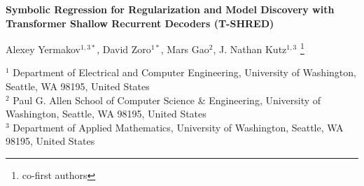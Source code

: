 \documentclass[11pt, a4paper]{article}
\begin{document}
\begin{center}
   { \LARGE \bf Symbolic Regression for Regularization and Model Discovery with Transformer Shallow Recurrent Decoders (T-SHRED)}
\end{center}
\begin{center}
      Alexey Yermakov$^{1,3*}$, David Zoro$^{1*}$, Mars Gao$^{2}$, J. Nathan Kutz$^{1,3}$
     \footnote{co-first authors}
\end{center}
\begin{center}
    \scriptsize{
    ${}^1$ Department of Electrical and Computer Engineering, University of Washington, Seattle, WA 98195, United States \\
    ${}^2$ Paul G. Allen School of Computer Science \& Engineering, University of Washington, Seattle, WA 98195, United States \\ 
    ${}^3$ Department of Applied Mathematics, University of Washington, Seattle, WA 98195, United States 
    }
\end{center}

\begin{abstract}
SHallow REcurrent Decoders (SHRED) have been shown to excel at system identification and forecasting from sparse sensor measurements. Previous uses of SHRED-based models relied on using Recurrent Neural Networks (RNNs) and simple Multi-Layer Perceptrons for the encoder and decoder. Despite the relatively simple backbone of these SHRED models, they are able to predict chaotic dynamical systems on different physical, spatial, and temporal scales directly from data. In this work, we leverage modern deep learning tools to further improve upon SHRED. In particular, we study the effects that using a Transformer for the encoder and a UNet for a decoder has on the performance of SHRED (T-SHRED) on next-step state prediction from a sparse set of randomly placed sensors. We also introduce Multi-Head SINDy Attention (MHSyA) into T-SHRED to perform symbolic regression directly on the latent space as part of the model architecture. We analyze the performance of T-SHRED on three different dynamical systems ranging from the low-data to the high-data regime. We observe that T-SHRED with MHSyA is both interpretable and outperforms other SHRED models on large datasets.
$ $\newline
$ $\newline
\noindent
\textbf{Keywords}: SHRED, SINDy, Symbolic Regression, Forecasting, Dynamical Systems, Transformers, Deep learning

\end{abstract}
\end{document}

